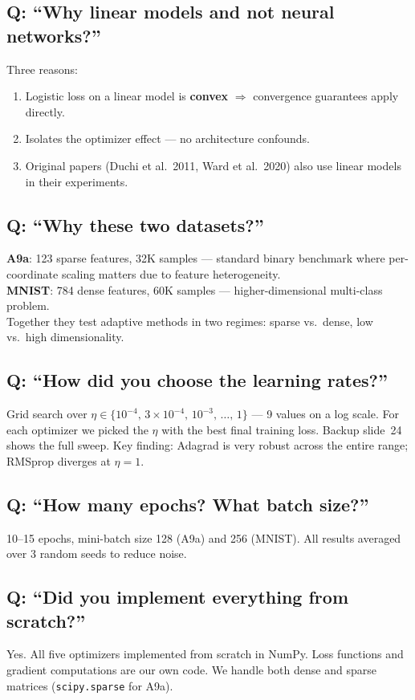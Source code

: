 \documentclass[10pt,a4paper]{article}
\begin{document}
\subsection{Q: ``Why linear models and not neural networks?''}
Three reasons:
\begin{enumerate}[nosep]
  \item Logistic loss on a linear model is \textbf{convex} $\Rightarrow$ convergence guarantees apply directly.
  \item Isolates the optimizer effect --- no architecture confounds.
  \item Original papers (Duchi et al.\ 2011, Ward et al.\ 2020) also use linear models in their experiments.
\end{enumerate}

\subsection{Q: ``Why these two datasets?''}
\textbf{A9a}: 123 sparse features, 32K samples --- standard binary benchmark where per-coordinate scaling matters due to feature heterogeneity.\\
\textbf{MNIST}: 784 dense features, 60K samples --- higher-dimensional multi-class problem.\\
Together they test adaptive methods in two regimes: sparse vs.\ dense, low vs.\ high dimensionality.

\subsection{Q: ``How did you choose the learning rates?''}
Grid search over $\eta \in \{10^{-4},\, 3\!\times\!10^{-4},\, 10^{-3},\, \ldots,\, 1\}$ --- 9 values on a log scale.
For each optimizer we picked the $\eta$ with the best final training loss.
Backup slide~24 shows the full sweep.
Key finding: Adagrad is very robust across the entire range; RMSprop diverges at $\eta = 1$.

\subsection{Q: ``How many epochs? What batch size?''}
10--15 epochs, mini-batch size 128 (A9a) and 256 (MNIST).
All results averaged over 3 random seeds to reduce noise.

\subsection{Q: ``Did you implement everything from scratch?''}
Yes. All five optimizers implemented from scratch in NumPy.
Loss functions and gradient computations are our own code.
We handle both dense and sparse matrices (\texttt{scipy.sparse} for A9a).
\end{document}
